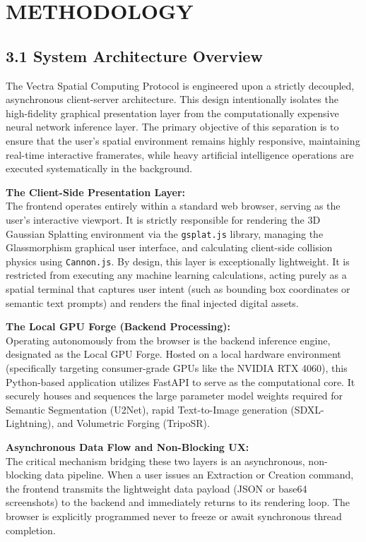 \section{METHODOLOGY}

\subsection*{3.1 System Architecture Overview}
The Vectra Spatial Computing Protocol is engineered upon a strictly decoupled, asynchronous client-server architecture. This design intentionally isolates the high-fidelity graphical presentation layer from the computationally expensive neural network inference layer. The primary objective of this separation is to ensure that the user's spatial environment remains highly responsive, maintaining real-time interactive framerates, while heavy artificial intelligence operations are executed systematically in the background.

\vspace{0.3cm}
\textbf{The Client-Side Presentation Layer:} \\
The frontend operates entirely within a standard web browser, serving as the user's interactive viewport. It is strictly responsible for rendering the 3D Gaussian Splatting environment via the \texttt{gsplat.js} library, managing the Glassmorphism graphical user interface, and calculating client-side collision physics using \texttt{Cannon.js}. By design, this layer is exceptionally lightweight. It is restricted from executing any machine learning calculations, acting purely as a spatial terminal that captures user intent (such as bounding box coordinates or semantic text prompts) and renders the final injected digital assets.

\vspace{0.3cm}
\textbf{The Local GPU Forge (Backend Processing):} \\
Operating autonomously from the browser is the backend inference engine, designated as the Local GPU Forge. Hosted on a local hardware environment (specifically targeting consumer-grade GPUs like the NVIDIA RTX 4060), this Python-based application utilizes FastAPI to serve as the computational core. It securely houses and sequences the large parameter model weights required for Semantic Segmentation (U2Net), rapid Text-to-Image generation (SDXL-Lightning), and Volumetric Forging (TripoSR). 

\vspace{0.3cm}
\textbf{Asynchronous Data Flow and Non-Blocking UX:} \\
The critical mechanism bridging these two layers is an asynchronous, non-blocking data pipeline. When a user issues an Extraction or Creation command, the frontend transmits the lightweight data payload (JSON or base64 screenshots) to the backend and immediately returns to its rendering loop. The browser is explicitly programmed never to freeze or await synchronous thread completion. 

